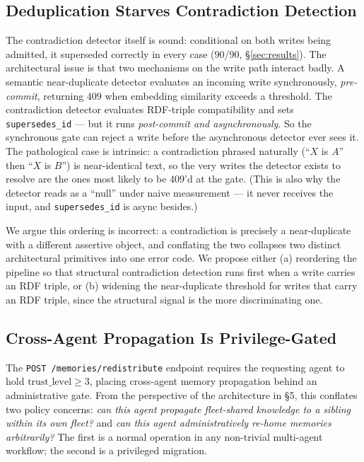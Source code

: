 \documentclass[10pt,twocolumn,letterpaper]{article}
\begin{document}
\subsection{Deduplication Starves Contradiction Detection}
\label{sec:findings-dedup}

The contradiction detector itself is sound: conditional on both writes being admitted, it superseded correctly in every case (\(90/90\), \S\ref{sec:results}). The architectural issue is that two mechanisms on the write path interact badly. A semantic near-duplicate detector evaluates an incoming write synchronously, \emph{pre-commit}, returning \(409\) when embedding similarity exceeds a threshold. The contradiction detector evaluates RDF-triple compatibility and sets \texttt{supersedes\_id} --- but it runs \emph{post-commit and asynchronously}. So the synchronous gate can reject a write before the asynchronous detector ever sees it. The pathological case is intrinsic: a contradiction phrased naturally (``\(X\) is \(A\)'' then ``\(X\) is \(B\)'') is near-identical text, so the very writes the detector exists to resolve are the ones most likely to be 409'd at the gate. (This is also why the detector reads as a ``null'' under naive measurement --- it never receives the input, and \texttt{supersedes\_id} is async besides.)

We argue this ordering is incorrect: a contradiction is precisely a near-duplicate with a different assertive object, and conflating the two collapses two distinct architectural primitives into one error code. We propose either (a) reordering the pipeline so that structural contradiction detection runs first when a write carries an RDF triple, or (b) widening the near-duplicate threshold for writes that carry an RDF triple, since the structural signal is the more discriminating one.

\subsection{Cross-Agent Propagation Is Privilege-Gated}

The \texttt{POST /memories/redistribute} endpoint requires the requesting agent to hold \(\text{trust\_level} \ge 3\), placing cross-agent memory propagation behind an administrative gate. From the perspective of the architecture in \S5, this conflates two policy concerns: \emph{can this agent propagate fleet-shared knowledge to a sibling within its own fleet?} and \emph{can this agent administratively re-home memories arbitrarily?} The first is a normal operation in any non-trivial multi-agent workflow; the second is a privileged migration.
\end{document}
